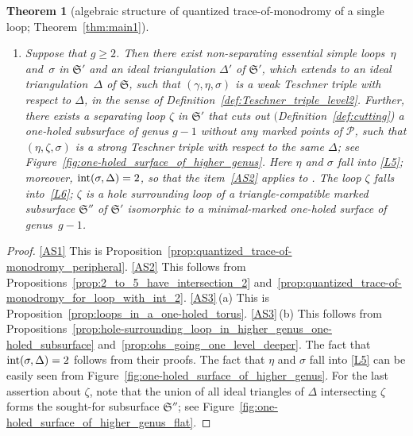 \documentclass[10pt,a4paper]{amsart}
\numberwithin{equation}{section}
\newtheorem{Theorem}{Theorem}[section]
\theoremstyle{definition}
\begin{document}
\begin{Theorem}[algebraic structure of quantized trace-of-monodromy of a single loop; Theorem~\ref{thm:main1}]
\begin{enumerate}[label={\rm (AS\arabic*)}]
\begin{enumerate}[label={\rm (\alph*)}]
\item Suppose that $g\ge 2$. Then there exist non-separating essential simple loops~$\eta$ and~$\sigma$ in $\mathfrak{S}'$ and an ideal triangulation $\Delta'$ of $\mathfrak{S}'$, which extends to an ideal triangulation~$\Delta$ of $\mathfrak{S}$, such that $(\gamma,\eta,\sigma)$ is a weak Teschner triple with respect to $\Delta$, in the sense of Definition~{\rm \ref{def:Teschner_triple_level2}}. Further, there exists a separating loop $\zeta$ in $\mathfrak{S}'$ that cuts out $($Definition~{\rm \ref{def:cutting})} a one-holed subsurface of genus $g-1$ without any marked points of $\mathcal{P}$, such that $(\eta,\zeta,\sigma)$ is a strong Teschner triple with respect to the same $\Delta$; see Figure~{\rm \ref{fig:one-holed_surface_of_higher_genus}}. Here $\eta$ and $\sigma$ fall into \ref{L5}; moreover, ${\rm int}(\sigma,\Delta)=2$, so that the item~\ref{AS2} applies to . The loop $\zeta$ falls into~\ref{L6};
$\zeta$ is a hole surrounding loop of a triangle-compatible marked subsurface $\mathfrak{S}''$ of $\mathfrak{S}'$ isomorphic to a minimal-marked one-holed surface of genus~$g-1$.
\end{enumerate}
\end{enumerate}
\end{Theorem}

\begin{proof} \ref{AS1} This is Proposition~\ref{prop:quantized_trace-of-monodromy_peripheral}.
\ref{AS2} This follows from Propositions~\ref{prop:2_to_5_have_intersection_2} and~\ref{prop:quantized_trace-of-monodromy_for_loop_with_int_2}.
\ref{AS3}\,{\rm (a)} This is Proposition~\ref{prop:loops_in_a_one-holed_torus}.
\ref{AS3}\,{\rm (b)} This follows from Propositions~\ref{prop:hole-surrounding_loop_in_higher_genus_one-holed_subsurface} and~\ref{prop:ohs_going_one_level_deeper}. The fact that ${\rm int}(\sigma,\Delta)=2$ follows from their proofs. The fact that $\eta$ and $\sigma$ fall into \ref{L5} can be easily seen from Figure~\ref{fig:one-holed_surface_of_higher_genus}. For the last assertion about $\zeta$, note that the union of all ideal triangles of $\Delta$ intersecting $\zeta$ forms the sought-for subsurface $\mathfrak{S}''$; see Figure~\ref{fig:one-holed_surface_of_higher_genus_flat}.
\end{proof}
\end{document}
